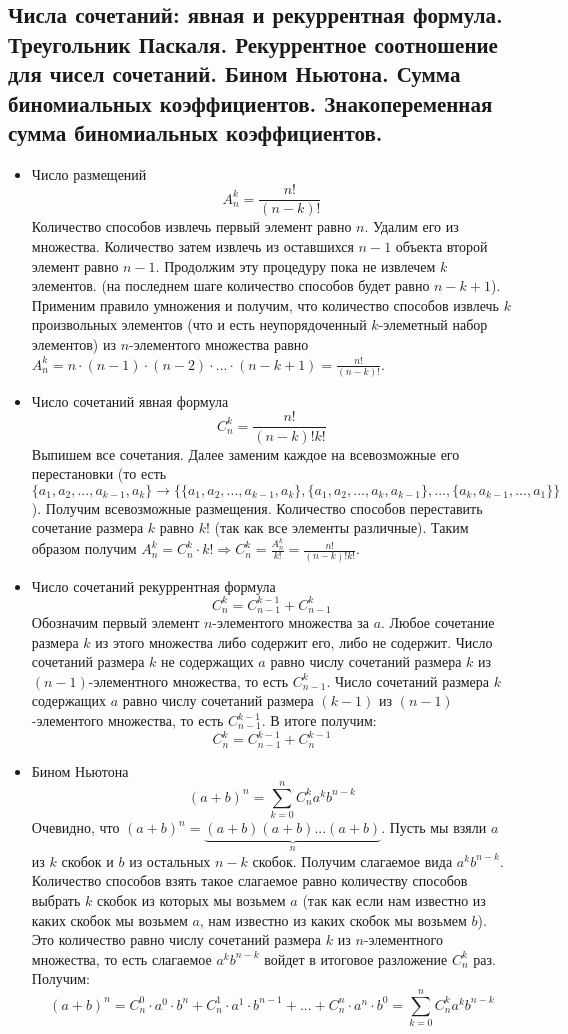 \subsection{Числа сочетаний: явная и рекуррентная формула. Треугольник Паскаля. Рекуррентное соотношение для чисел сочетаний. Бином Ньютона. Сумма биномиальных коэффициентов. Знакопеременная сумма биномиальных коэффициентов.}
\begin{itemize}
	\item Число размещений
	$$A^k_n = \frac{n!}{(n-k)!}$$
	Количество способов извлечь первый элемент равно $n$. Удалим его из множества. Количество затем извлечь из оставшихся $n-1$ объекта второй элемент равно $n - 1$. Продолжим эту процедуру пока не извлечем $k$ элементов. (на последнем шаге количество способов будет равно $n - k + 1$). Применим правило умножения и получим, что количество способов извлечь $k$ произвольных элементов (что и есть неупорядоченный $k$-элеметный набор элементов) из $n$-элементого множества равно $A^k_n = n \cdot (n - 1) \cdot (n - 2) \cdot ... \cdot (n - k + 1) = \frac{n!}{(n-k)!}$.
	
	\item Число сочетаний явная формула
	$$C^k_n = \frac{n!}{(n-k)!k!}$$
	Выпишем все сочетания. Далее заменим каждое на всевозможные его перестановки (то есть $\{a_1, a_2, ..., a_{k-1},a_k\} \to \{\{a_1, a_2, ..., a_{k-1},a_k\}, \{a_1, a_2, ..., a_{k}, a_{k-1}\},...,\{a_k, a_{k-1}, ..., a_1\}\}$). Получим всевозможные размещения. Количество способов переставить сочетание размера $k$ равно $k!$ (так как все элементы различные). Таким образом получим $A^k_n = C^k_n \cdot k! \Rightarrow C^k_n = \frac{A^k_n}{k!} = \frac{n!}{(n-k)!k!}$.
	
	\item Число сочетаний рекуррентная формула
	$$C^k_n = C^{k-1}_{n-1} + C^{k}_{n-1}$$
	Обозначим первый элемент $n$-элементого множества за $a$. Любое сочетание размера $k$ из этого множества либо содержит его, либо не содержит. Число сочетаний размера $k$ не содержащих $a$ равно числу сочетаний размера $k$ из $(n-1)$-элементного множества, то есть $C^k_{n-1}$. Число сочетаний размера $k$ содержащих $a$ равно числу сочетаний размера $(k - 1)$ из $(n - 1)$-элементого множества, то есть $C^{k-1}_{n-1}$. В итоге получим:
	$$C^k_n = C^{k-1}_{n-1} + C^{k-1}_{n}$$
	
	\item Бином Ньютона
	$$(a + b)^n = \sum_{k=0}^{n}C^k_na^kb^{n-k}$$
	Очевидно, что $(a + b)^n = \underbrace{(a+b)(a+b)...(a+b)}_{n}$. Пусть мы взяли $a$ из $k$ скобок и $b$ из остальных $n - k$ скобок. Получим слагаемое вида $a^kb^{n-k}$. Количество способов взять такое слагаемое равно количеству способов выбрать $k$ скобок из которых мы возьмем $a$ (так как если нам известно из каких скобок мы возьмем $a$, нам известно из каких скобок мы возьмем $b$). Это количество равно числу сочетаний размера $k$ из $n$-элементного множества, то есть слагаемое $a^kb^{n-k}$ войдет в итоговое разложение $C^k_n$ раз. Получим:
	$$(a+b)^n = C^0_n \cdot a^0 \cdot b^n + C^1_n \cdot a^1 \cdot b^{n-1} + ... + C^n_n \cdot a^n \cdot b^0 = \sum_{k=0}^{n}C^k_na^kb^{n-k}$$
	

\end{itemize}
